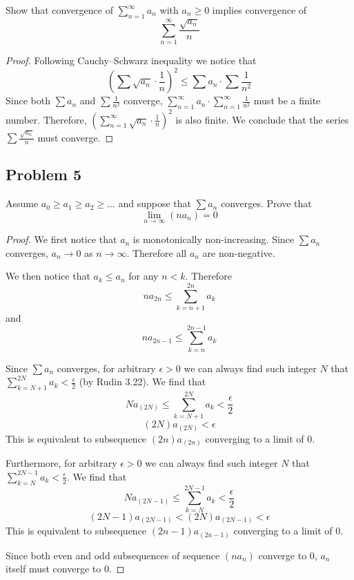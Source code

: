 \documentclass{article}
\begin{document}
\begin{tcolorbox}
Show that convergence of $\sum_{n=1}^\infty a_n$ with $a_n \geq 0$ implies convergence of 
$$ \sum_{n=1}^\infty \frac{\sqrt{a_n}}{n} $$
\end{tcolorbox}

\begin{proof}
Following Cauchy–Schwarz inequality we notice that
$$ \left( \sum \sqrt{a_n} \cdot \frac{1}{n} \right)^2 \leq \sum a_n \cdot \sum \frac{1}{n^2} $$
Since both $\sum a_n$ and $\sum \frac{1}{n^2}$ converge, $\sum_{n=1}^\infty a_n \cdot \sum_{n=1}^\infty \frac{1}{n^2}$ must be a finite number. Therefore, $\left( \sum_{n=1}^\infty \sqrt{a_n} \cdot \frac{1}{n} \right) ^ 2$ is also finite. We conclude that the series $\sum \frac{\sqrt{a_n}}{n}$ must converge.
\end{proof}


\subsection*{Problem 5}

\begin{tcolorbox}
Assume $a_0 \geq a_1 \geq a_2 \geq \dots$ and suppose that $\sum a_n$ converges. Prove that
$$ \lim_{n \to \infty} (n a_n) = 0 $$
\end{tcolorbox}

\begin{proof}
We first notice that $a_n$ is monotonically non-increasing. Since $\sum a_n$ converges, $a_n \to 0$ as $n \to \infty$. Therefore all $a_n$ are non-negative.

We then notice that $a_{k} \leq a_n$ for any $n < k$. Therefore
$$ n a_{2n} \leq \sum_{k=n+1}^{2n} a_k $$
and 
$$ n a_{2n-1} \leq \sum_{k=n}^{2n-1} a_k $$

Since $\sum a_n$ converges, for arbitrary $\epsilon>0$ we can always find such integer $N$ that $\sum_{k=N+1}^{2N} a_k < \frac{\epsilon}{2}$ (by Rudin 3.22). We find that
$$ N a_{(2N)} \leq \sum_{k=N+1}^{2N} a_k < \frac{\epsilon}{2} $$
$$ (2N) a_{(2N)} < \epsilon $$
This is equivalent to subsequence $(2n) a_{(2n)}$ converging to a limit of $0$.

Furthermore, for arbitrary $\epsilon>0$ we can always find such integer $N$ that $\sum_{k=N}^{2N-1} a_k < \frac{\epsilon}{2}$. We find that
$$ N a_{(2N-1)} \leq \sum_{k=N}^{2N-1} a_k < \frac{\epsilon}{2} $$
$$ (2N-1) a_{(2N-1)} < (2N) a_{(2N-1)} < \epsilon $$
This is equivalent to subsequence $(2n-1) a_{(2n-1)}$ converging to a limit of $0$.

Since both even and odd subsequences of sequence $(n a_n)$ converge to $0$, $a_n$ itself must converge to $0$. 
\end{proof}
\end{document}
